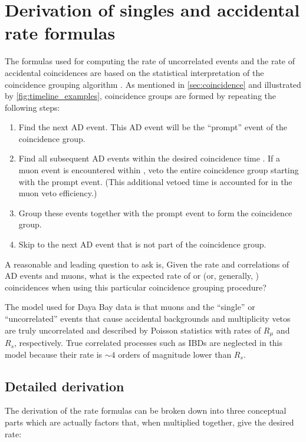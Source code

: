 \chapter{Derivation of singles and accidental rate formulas}
\label{ap:singlesformula}

The formulas used for computing the rate of uncorrelated events
and the rate of accidental coincidences
are based on the statistical interpretation
of the coincidence grouping algorithm \cite{thucoinc2015}.
As mentioned in \cref{sec:coincidence}
and illustrated by \cref{fig:timeline_examples},
coincidence groups are formed by repeating the following steps:

\begin{enumerate}
    \item Find the next AD event.
        This AD event will be the ``prompt'' event of the coincidence group.
    \item Find all subsequent AD events within the desired coincidence time \tc.
        If a muon event is encountered within \tc,
        veto the entire coincidence group starting with the prompt event.
        (This additional vetoed time is accounted for in the muon veto efficiency.)
    \item Group these events together with the prompt event
        to form the coincidence group.
    \item Skip to the next AD event that is not part of the coincidence group.
\end{enumerate}

A reasonable and leading question to ask is,
Given the rate and correlations of AD events and muons,
what is the expected rate of  or 
(or, generally, ) coincidences when using
this particular coincidence grouping procedure?

The model used for Daya Bay data is that muons
and the ``single'' or ``uncorrelated''
events that cause accidental backgrounds and
multiplicity vetos are truly uncorrelated and described by
Poisson statistics with rates of $R_\mu$ and $R_s$, respectively.
True correlated processes such as IBDs are neglected in this model
because their rate is $\sim 4$ orders of magnitude lower than $R_s$.

\section{Detailed derivation}

The derivation of the rate formulas can be broken down into three
conceptual parts which are actually factors that, when multiplied together,
give the desired rate:


